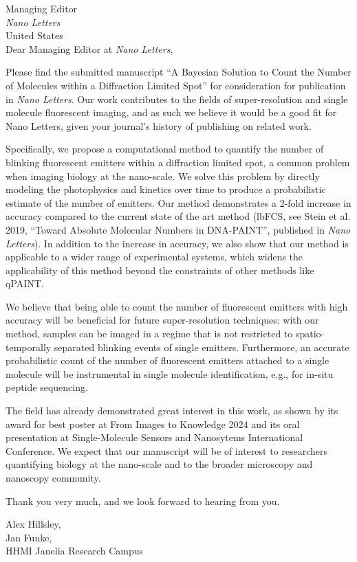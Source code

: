 \documentclass{article}
\date{\today}
\begin{document}
\thispagestyle{empty}
Managing Editor\\
\textit{Nano Letters}\\
United States\\

\vspace{5mm}
Dear Managing Editor at \textit{Nano Letters},


Please find the submitted manuscript
``A Bayesian Solution to Count the Number of Molecules within a Diffraction Limited Spot''
for consideration for publication in \textit{Nano Letters}. 
%
%
Our work contributes to the fields of super-resolution and single molecule
fluorescent imaging, and as such we believe it would be a good fit for Nano
Letters, given your journal's history of publishing on related work.
%

Specifically, we propose a computational method to quantify the number of
blinking fluorescent emitters within a diffraction limited spot, a common
problem when imaging biology at the nano-scale.
%
We solve this problem by directly modeling the photophysics and kinetics over
time to produce a probabilistic estimate of the number of emitters.
%
Our method demonstrates a 2-fold increase in accuracy compared to the current
state of the art method (lbFCS, see Stein et al. 2019, ``Toward Absolute
Molecular Numbers in DNA-PAINT'', published in \textit{Nano Letters}). In addition to
the increase in accuracy, we also show that our method is applicable to a wider
range of experimental systems, which widens the applicability of this method
beyond the constraints of other methods like qPAINT.

We believe that being able to count the number of fluorescent emitters with
high accuracy will be beneficial for future super-resolution techniques: with
our method, samples can be imaged in a regime that is not restricted to
spatio-temporally separated blinking events of single emitters. Furthermore, an
accurate probabilistic count of the number of fluorescent emitters attached to
a single molecule will be instrumental in single molecule identification, e.g.,
for in-situ peptide sequencing.

The field has already demonstrated great interest in this work, as shown by its award for 
best poster at From Images to Knowledge 2024 and its oral presentation at 
Single-Molecule Sensors and Nanosytems International Conference. 
%
We expect that our manuscript will be of interest to researchers quantifying biology at the nano-scale 
and to the broader microscopy and nanoscopy community.

Thank you very much, and we look forward to hearing from you.

\vspace{5mm}
Alex Hillsley,\\
Jan Funke,\\
HHMI Janelia Research Campus
\end{document}
